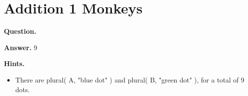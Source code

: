 \documentclass{article}
\begin{document}
\section*{Addition 1 Monkeys}
\textbf{Question.} 

\textbf{Answer.} 9

\textbf{Hints.}
\begin{itemize}
  \item There are plural( A, "blue dot" ) and plural( B, "green dot" ), for a total of 9 dots.
\end{itemize}
\end{document}
